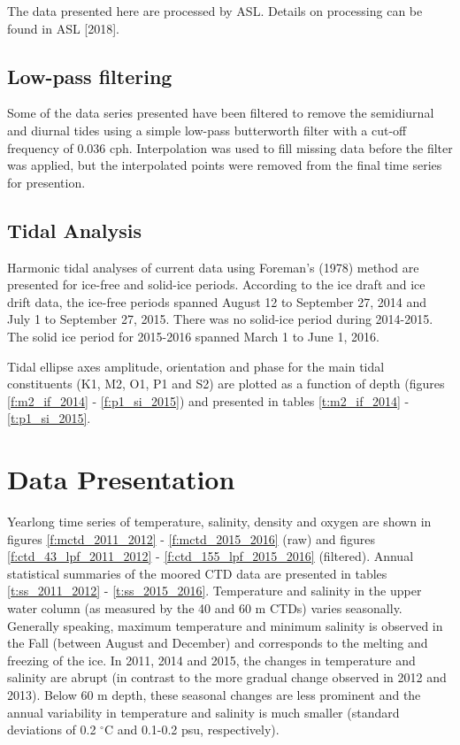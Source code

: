 \documentclass[12pt]{dforeport}
\begin{document}
The data presented here are processed by ASL.  Details on processing can be found in ASL [2018].

\subsection{Low-pass filtering}

Some of the data series presented have been filtered to remove the semidiurnal and diurnal tides using a simple low-pass butterworth filter with a cut-off frequency of 0.036 cph. Interpolation was used to fill missing data before the filter was applied, but the interpolated points were removed from the final time series for presention.

\subsection{Tidal Analysis}

Harmonic tidal analyses of current data using Foreman's (1978) method are presented for ice-free and solid-ice periods. According to the ice draft and ice drift data, the ice-free periods spanned August 12 to September 27, 2014 and July 1 to September 27, 2015. There was no solid-ice period during 2014-2015. The solid ice period for 2015-2016 spanned March 1 to June 1, 2016.  

Tidal ellipse axes amplitude, orientation and phase for the main tidal constituents (K1, M2, O1, P1 and S2) are plotted as a function of depth (figures \ref{f:m2_if_2014} - \ref{f:p1_si_2015}) and presented in tables \ref{t:m2_if_2014} - \ref{t:p1_si_2015}.


\section{Data Presentation}

Yearlong time series of temperature, salinity, density and oxygen are shown in figures \ref{f:mctd_2011_2012} - \ref{f:mctd_2015_2016} (raw) and figures \ref{f:ctd_43_lpf_2011_2012} - \ref{f:ctd_155_lpf_2015_2016} (filtered).  Annual statistical summaries of the moored CTD data are presented in tables \ref{t:ss_2011_2012} - \ref{t:ss_2015_2016}. Temperature and salinity in the upper water column (as measured by the 40 and 60 m CTDs) varies seasonally. Generally speaking, maximum temperature and minimum salinity is observed in the Fall (between August and December) and corresponds to the melting and freezing of the ice. In 2011, 2014 and 2015, the changes in temperature and salinity are abrupt (in contrast to the more gradual change observed in 2012 and 2013). Below 60 m depth, these seasonal changes are less prominent and the annual variability in temperature and salinity is much smaller (standard deviations of 0.2 $^{\circ}$C and 0.1-0.2 psu, respectively).
\end{document}
